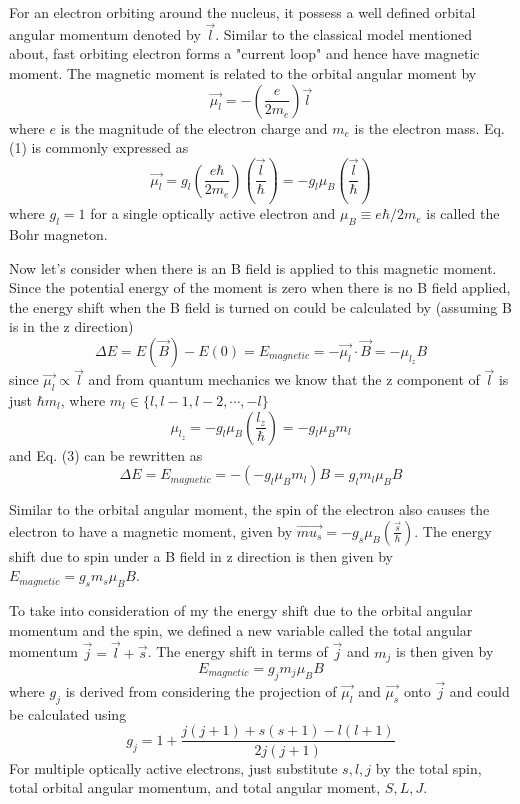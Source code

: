 \documentclass[11pt]{article}
\begin{document}
For an electron orbiting around the nucleus, it possess a well defined orbital angular momentum denoted by $\vec{l}$. Similar to the classical model mentioned about, fast orbiting electron forms a "current loop" and hence have magnetic moment. The magnetic moment is related to the orbital angular moment by 
\begin{equation}\label{eqn:einstein}
\vec{\mu_{l}} = - (\frac{e}{2m_e}) \vec{l}
\end{equation}
where $e$ is the magnitude of the electron charge and $m_e$ is the electron mass. Eq. (1) is commonly expressed as 
\begin{equation}\label{eqn:einstein}
\vec{\mu_{l}} = g_l (\frac{e \hbar}{2m_e}) (\frac{\vec{l}}{\hbar}) = -g_l \mu_B  (\frac{\vec{l}}{\hbar})
\end{equation}
where $g_l =1$ for a single optically active electron and $\mu_B \equiv e\hbar/2m_e$ is called the Bohr magneton.

Now let's consider when there is an B field is applied to this magnetic moment. Since the potential energy of the moment is zero when there is no B field applied, the energy shift when the B field is turned on could be calculated by (assuming B is in the z direction)
\begin{equation}\label{eqn:einstein}
\Delta E = E(\vec{B}) - E(0) = E_{magnetic} = - \vec{\mu_l} \cdot \vec{B} = -\mu_{l_z} B
\end{equation}
since $\vec{\mu_l }\propto \vec{l}$ and from quantum mechanics we know that the z component of $\vec{l}$ is just $\hbar m_l$, where $m_l \in \{ l, l-1, l-2, \cdots, -l \}$\begin{equation}\label{eqn:einstein}
\mu_{l_z} = -g_l \mu_B (\frac{l_z}{\hbar}) = -g_l \mu_B m_l 
\end{equation}
and Eq. (3) can be rewritten as
\begin{equation}\label{eqn:einstein}
\Delta E = E_{magnetic} = -(-g_l \mu_B m_l) B = g_l m_l \mu_B B
\end{equation}

Similar to the orbital angular moment, the spin of the electron also causes the electron to have a magnetic moment, given by $\vec{mu_s} = -g_s \mu_B (\frac{\vec{s}}{\hbar})$. The energy shift due to spin under a B field in z direction is then given by $E_{magnetic} = g_s m_s \mu_B B$.

To take into consideration of my the energy shift due to the orbital angular momentum and the spin, we defined a new variable called the total angular momentum $\vec{j} = \vec{l} + \vec{s}$. The energy shift in terms of $\vec{j}$ and $m_j$ is then  given by 
\begin{equation}\label{eqn:einstein}
E_{magnetic} = g_j m_j \mu_B B
 \end{equation}
 where $g_j$ is derived from considering the projection of $\vec{\mu_l}$ and $\vec{\mu_s}$ onto $\vec{j}$ and could be calculated using 
 \begin{equation}\label{eqn:einstein}
 g_j = 1 + \frac{j(j+1) + s(s+1)-l(l+1)}{2j(j+1)}
 \end{equation}
 For multiple optically active electrons, just substitute $s, l, j$ by the total spin, total orbital angular momentum, and total angular moment, $S, L,J$.
 
\end{document}
